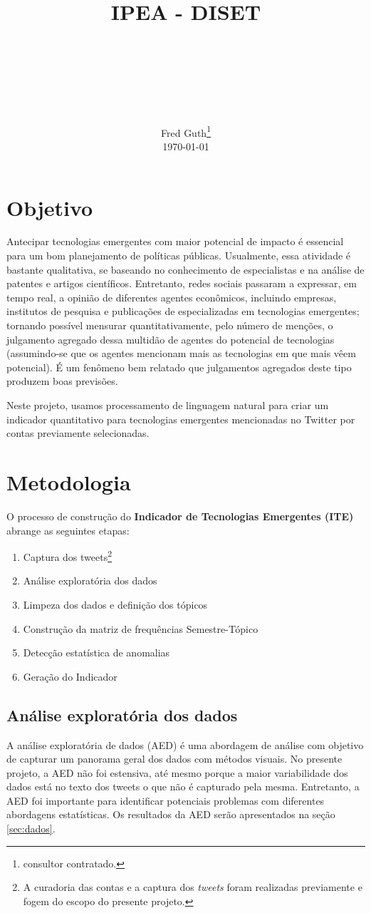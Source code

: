 \documentclass[paper=a4, fontsize=11pt]{scrartcl}
\title{
		\usefont{OT1}{bch}{b}{n}
		\normalfont \normalsize \textsc{IPEA - DISET} \\ [25pt]
		\horrule{0.5pt} \\[0.4cm]
		\huge \projectname \\
		\horrule{2pt} \\[0.5cm]
}
\author{
		\normalfont 								\normalsize
        Fred Guth\footnote{consultor contratado.}\\[-3pt]		\normalsize
        \today
}
\date{}
\numberwithin{equation}{section}		%
\numberwithin{figure}{section}			%
\numberwithin{table}{section}				%
\begin{document}
\maketitle
\thispagestyle{empty}
\section{Objetivo}
Antecipar tecnologias emergentes com maior potencial de impacto é essencial para um bom planejamento de políticas públicas.  Usualmente, essa atividade é bastante qualitativa, se baseando no conhecimento de especialistas e na análise de patentes e artigos científicos. Entretanto, redes sociais passaram a expressar, em tempo real, a opinião de diferentes agentes econômicos, incluindo empresas, institutos de pesquisa e publicações de especializadas em tecnologias emergentes; tornando possível mensurar quantitativamente, pelo número de menções, o julgamento agregado dessa multidão de agentes  do potencial de tecnologias (assumindo-se que os agentes mencionam mais as tecnologias em que mais vêem potencial). É um fenômeno bem relatado \citep{surowiecki2004wisdom} que julgamentos agregados deste tipo produzem boas previsões.

Neste projeto, usamos processamento de linguagem natural para criar um indicador quantitativo para tecnologias emergentes mencionadas no Twitter por contas previamente selecionadas.

\section{Metodologia}
O processo de construção do \textbf{Indicador de Tecnologias Emergentes (ITE)} abrange as seguintes etapas:
\begin{enumerate}
	\item Captura dos tweets\footnote{A curadoria das contas e a captura dos \emph{tweets} foram realizadas previamente e fogem do escopo do presente projeto.}
	\item Análise exploratória dos dados
	\item Limpeza dos dados e definição dos tópicos
	\item Construção da matriz de frequências Semestre-Tópico
	\item Detecção estatística de anomalias
	\item Geração do Indicador
\end{enumerate}
\subsection{Análise exploratória dos dados}
A análise exploratória de dados (AED) é uma abordagem de análise com objetivo de capturar um panorama geral dos dados com métodos visuais. No presente projeto, a AED não foi estensiva, até mesmo porque a maior variabilidade dos dados está no texto dos tweets o que não é capturado pela mesma. Entretanto, a AED foi importante para identificar potenciais problemas com diferentes abordagens estatísticas. Os resultados da AED serão apresentados na seção \ref{sec:dados}.
\end{document}

